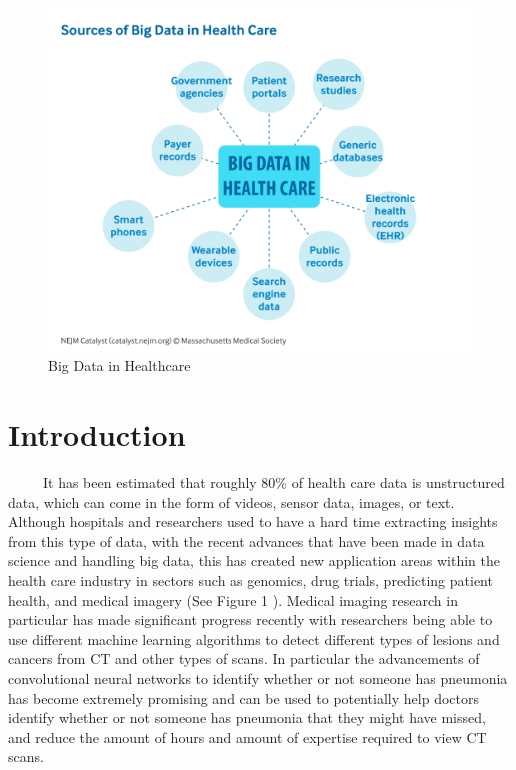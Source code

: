 \documentclass[12pt]{article}
\begin{document}
\newpage
{} %

\begin{figure}

{\centering \includegraphics[width=0.75\linewidth,height=0.25\textheight]{images/big-data-healthcare} 

}

\caption{Big Data in Healthcare}\label{fig:sample-fig}
\end{figure}

\hypertarget{introduction}{%
\section{Introduction}\label{introduction}}

~~~~~It has been estimated that roughly 80\% of health care data is
unstructured data, which can come in the form of videos, sensor data,
images, or text. Although hospitals and researchers used to have a hard
time extracting insights from this type of data, with the recent
advances that have been made in data science and handling big data, this
has created new application areas within the health care industry in
sectors such as genomics, drug trials, predicting patient health, and
medical imagery (See Figure 1 \citet{NEJM}). Medical imaging research in
particular has made significant progress recently with researchers being
able to use different machine learning algorithms to detect different
types of lesions and cancers from CT and other types of scans. In
particular the advancements of convolutional neural networks to identify
whether or not someone has pneumonia has become extremely promising and
can be used to potentially help doctors identify whether or not someone
has pneumonia that they might have missed, and reduce the amount of
hours and amount of expertise required to view CT scans.
\end{document}
